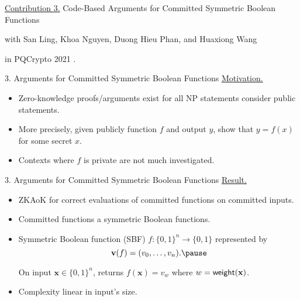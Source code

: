 \begin{frame}
	\underline{Contribution 3.} Code-Based Arguments for Committed Symmetric Boolean Functions
	
	{\small with San Ling, Khoa Nguyen, Duong Hieu Phan, and Huaxiong Wang}
	
	in PQCrypto 2021 \cite{LingNPTW21}.
\end{frame}

\begin{frame}{3. Arguments for Committed Symmetric Boolean Functions}
	\underline{Motivation.} \pause
	\begin{itemize}
		\item Zero-knowledge proofs/arguments exist for all NP statements consider public statements.\pause
		\item More precisely, given publicly function $f$ and output $y$, show that $y = f(x)$ for some secret $x$.\pause
		\item Contexts where $f$ is private are not much investigated.
	\end{itemize}
\end{frame} 
\begin{frame}{3. Arguments for Committed Symmetric Boolean Functions}
	\underline{Result.}\pause
	\begin{itemize}
		\item ZKAoK for correct evaluations of committed functions on committed inputs.\pause
		\item Committed functions a symmetric Boolean functions.\pause
		\item Symmetric Boolean function (SBF) $f : \{0,1\}^n \to \{0,1\}$ represented by \pause
		\begin{equation*}
			\mathbf{v}(f) = (v_0, \dots, v_n).\pause
		\end{equation*}
		
		On input $\mathbf{x} \in \{0,1\}^n$, returns $f(\mathbf{x}) = v_w$ where $w = \mathsf{weight}(\mathbf{x})$.\pause
		\item Complexity linear in input's size.
	\end{itemize}
\end{frame}

